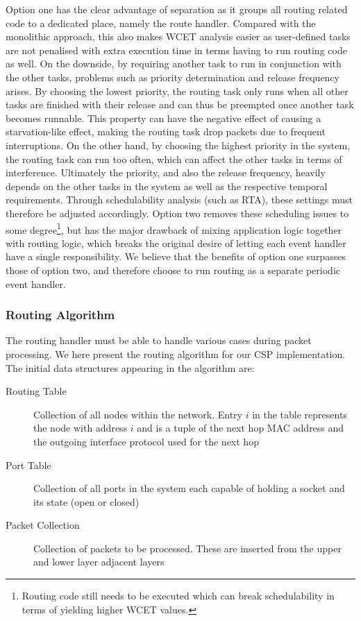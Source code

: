 Option one has the clear advantage of separation as it groups all routing related code to a dedicated place, namely the route handler. Compared with the monolithic approach, this also makes WCET analysis easier as user-defined tasks are not penalised with extra execution time in terms having to run routing code as well. On the downside, by requiring another task to run in conjunction with the other tasks, problems such as priority determination and release frequency arises. By choosing the lowest priority, the routing task only runs when all other tasks are finished with their release and can thus be preempted once another task becomes runnable. This property can have the negative effect of causing a starvation-like effect, making the routing task drop packets due to frequent interruptions. On the other hand, by choosing the highest priority in the system, the routing task can run too often, which can affect the other tasks in terms of interference. Ultimately the priority, and also the release frequency, heavily depends on the other tasks in the system as well as the respective temporal requirements. Through schedulability analysis (such as RTA), these settings must therefore be adjusted accordingly. Option two removes these scheduling issues to some degree\footnote{Routing code still needs to be executed which can break schedulability in terms of yielding higher WCET values.}, but has the major drawback of mixing application logic together with routing logic, which breaks the original desire of letting each event handler have a single responsibility. We believe that the benefits of option one surpasses those of option two, and therefore choose to run routing as a separate periodic event handler.

\subsubsection{Routing Algorithm}
The routing handler must be able to handle various cases during packet processing. We here present the routing algorithm for our CSP implementation. The initial data structures appearing in the algorithm are:

\begin{description}
	\item[Routing Table] Collection of all nodes within the network. Entry $i$ in the table represents the node with address $i$ and is a tuple of the next hop MAC address and the outgoing interface protocol used for the next hop 
	\item[Port Table] Collection of all ports in the system each capable of holding a socket and its state (open or closed)
	\item[Packet Collection] Collection of packets to be processed. These are inserted from the upper and lower layer adjacent layers
\end{description} 

